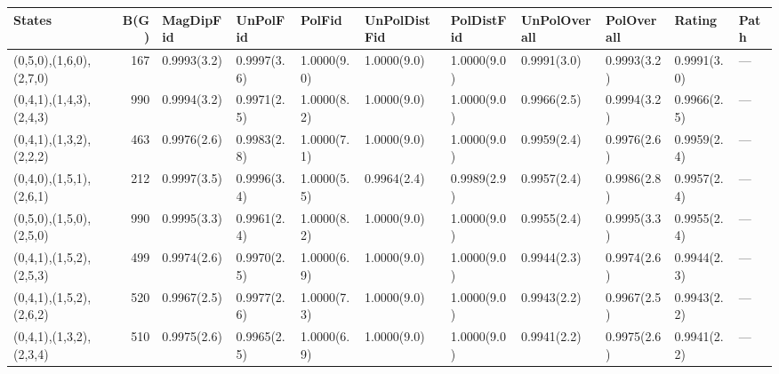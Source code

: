 \begin{tabular}{lrlllllllll}
\hline
 States                  &   B(G) & MagDipFid   & UnPolFid    & PolFid      & UnPolDistFid   & PolDistFid   & UnPolOverall   & PolOverall   & Rating      & Path   \\
\hline
 (0,5,0),(1,6,0),(2,7,0) &    167 & 0.9993(3.2) & 0.9997(3.6) & 1.0000(9.0) & 1.0000(9.0)    & 1.0000(9.0)  & 0.9991(3.0)    & 0.9993(3.2)  & 0.9991(3.0) & ---    \\
 (0,4,1),(1,4,3),(2,4,3) &    990 & 0.9994(3.2) & 0.9971(2.5) & 1.0000(8.2) & 1.0000(9.0)    & 1.0000(9.0)  & 0.9966(2.5)    & 0.9994(3.2)  & 0.9966(2.5) & ---    \\
 (0,4,1),(1,3,2),(2,2,2) &    463 & 0.9976(2.6) & 0.9983(2.8) & 1.0000(7.1) & 1.0000(9.0)    & 1.0000(9.0)  & 0.9959(2.4)    & 0.9976(2.6)  & 0.9959(2.4) & ---    \\
 (0,4,0),(1,5,1),(2,6,1) &    212 & 0.9997(3.5) & 0.9996(3.4) & 1.0000(5.5) & 0.9964(2.4)    & 0.9989(2.9)  & 0.9957(2.4)    & 0.9986(2.8)  & 0.9957(2.4) & ---    \\
 (0,5,0),(1,5,0),(2,5,0) &    990 & 0.9995(3.3) & 0.9961(2.4) & 1.0000(8.2) & 1.0000(9.0)    & 1.0000(9.0)  & 0.9955(2.4)    & 0.9995(3.3)  & 0.9955(2.4) & ---    \\
 (0,4,1),(1,5,2),(2,5,3) &    499 & 0.9974(2.6) & 0.9970(2.5) & 1.0000(6.9) & 1.0000(9.0)    & 1.0000(9.0)  & 0.9944(2.3)    & 0.9974(2.6)  & 0.9944(2.3) & ---    \\
 (0,4,1),(1,5,2),(2,6,2) &    520 & 0.9967(2.5) & 0.9977(2.6) & 1.0000(7.3) & 1.0000(9.0)    & 1.0000(9.0)  & 0.9943(2.2)    & 0.9967(2.5)  & 0.9943(2.2) & ---    \\
 (0,4,1),(1,3,2),(2,3,4) &    510 & 0.9975(2.6) & 0.9965(2.5) & 1.0000(6.9) & 1.0000(9.0)    & 1.0000(9.0)  & 0.9941(2.2)    & 0.9975(2.6)  & 0.9941(2.2) & ---    \\
\hline
\end{tabular}